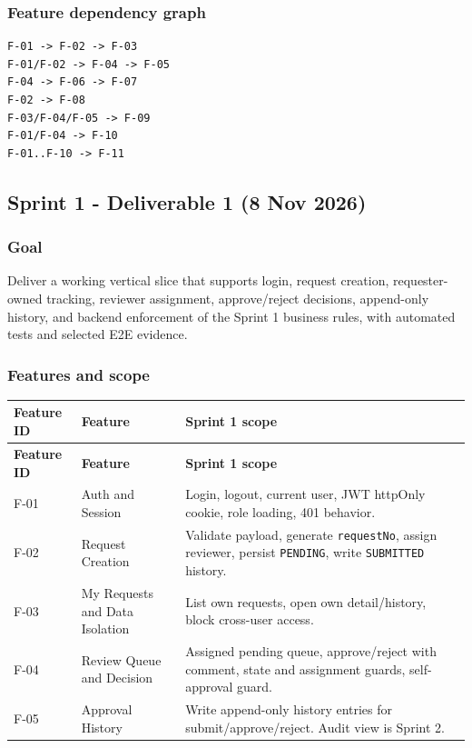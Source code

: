 \documentclass[11pt,a4paper]{article}
\begin{document}
\subsubsection{Feature dependency graph}

\begin{lstlisting}[basicstyle=\ttfamily\scriptsize]
F-01 -> F-02 -> F-03
F-01/F-02 -> F-04 -> F-05
F-04 -> F-06 -> F-07
F-02 -> F-08
F-03/F-04/F-05 -> F-09
F-01/F-04 -> F-10
F-01..F-10 -> F-11
\end{lstlisting}


\subsection{Sprint 1 - Deliverable 1 (8 Nov 2026)}

\subsubsection{Goal}

Deliver a working vertical slice that supports login, request creation, requester-owned tracking, reviewer assignment, approve/reject decisions, append-only history, and backend enforcement of the Sprint 1 business rules, with automated tests and selected E2E evidence.\\

\subsubsection{Features and scope}

\vspace{0.3em}
\begin{longtable}{|>{\RaggedRight}p{3.0cm}|>{\RaggedRight}p{6.8cm}|>{\RaggedRight}p{5.2cm}|}
\hline
\rowcolor{zenPale}\textbf{Feature ID} & \textbf{Feature} & \textbf{Sprint 1 scope} \\ \hline
\endfirsthead
\hline
\rowcolor{zenPale}\textbf{Feature ID} & \textbf{Feature} & \textbf{Sprint 1 scope} \\ \hline
\endhead
\hline
\endfoot
F-01 & Auth and Session & Login, logout, current user, JWT httpOnly cookie, role loading, 401 behavior. \\ \hline
F-02 & Request Creation & Validate payload, generate \texttt{requestNo}, assign reviewer, persist \texttt{PENDING}, write \texttt{SUBMITTED} history. \\ \hline
F-03 & My Requests and Data Isolation & List own requests, open own detail/history, block cross-user access. \\ \hline
F-04 & Review Queue and Decision & Assigned pending queue, approve/reject with comment, state and assignment guards, self-approval guard. \\ \hline
F-05 & Approval History & Write append-only history entries for submit/approve/reject. Audit view is Sprint 2. \\ \hline
\end{longtable}
\vspace{0.3em}
\end{document}
